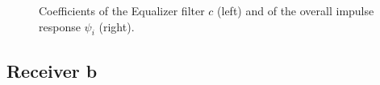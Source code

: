 \documentclass[a4paper, 12pt]{report}
\begin{document}
\begin{figure}[H]
	\centering
	\caption{Coefficients of the Equalizer filter $c$ (left) and of the overall impulse response $\psi_i$ (right).}\label{filters_a}
\end{figure}

 


\clearpage
\subsection*{Receiver b}
\end{document}
